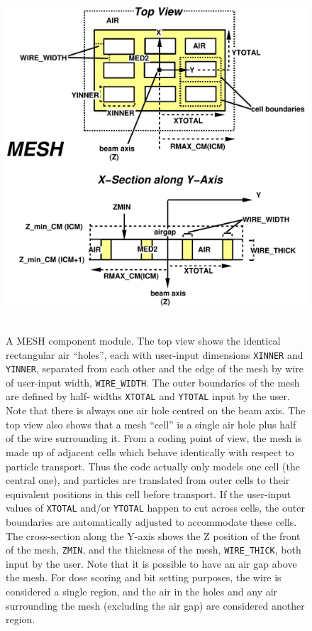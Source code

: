 \documentclass[12pt,twoside]{article}
\begin{document}
\begin{figure}[H]
\begin{center}
\begin{htmlonly}
\includegraphics[height=13cm]{figures/meshd}
\end{htmlonly}
\end{center}
\vspace*{-0.5cm}
\caption[MESH CM geometry]
{A MESH component module.  The top view shows the identical rectangular
air ``holes'',
each with user-input dimensions {\tt XINNER} and {\tt YINNER}, separated
from each other and the edge of the mesh by wire of user-input width,
{\tt WIRE\_WIDTH}.  The outer boundaries of the mesh are defined by half-
widths {\tt XTOTAL} and {\tt YTOTAL} input by the user.  Note that
there is always one air hole centred on the beam axis.  The top view
also shows that a mesh ``cell'' is a single air hole plus half of
the wire surrounding it.  From a coding point of view, the mesh
is made up of adjacent cells which behave identically with respect to
particle transport.  Thus the code actually only models one cell (the
central one), and particles are translated from outer cells to their
equivalent positions in this cell before transport.  If the user-input
values of {\tt XTOTAL} and/or {\tt YTOTAL} happen to cut across cells,
the outer boundaries are automatically adjusted to accommodate these
cells.  The cross-section along the Y-axis shows the
Z position of the front of the mesh, {\tt ZMIN}, and the thickness of
the mesh, {\tt WIRE\_THICK}, both input by the user.  Note that it is
possible to have an air gap above the mesh.  For dose scoring and bit
setting purposes, the wire is considered a single region, and the air
in the holes and any air surrounding the mesh (excluding the air gap) are
considered another region.}
\label{fig_MESHD}
\end{figure}
\end{document}
